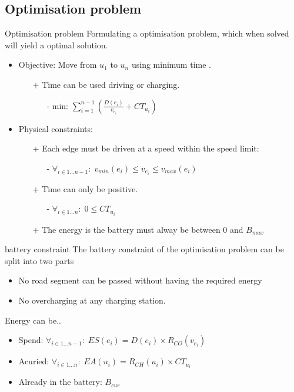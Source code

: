 \subsection{Optimisation problem}
\begin{frame}{Optimisation problem}
Formulating a optimisation problem, which when solved will yield a optimal solution. 
\begin{itemize}
\item Objective: Move from $u_1$ to $u_n$ using minimum time . 
\begin{itemize}
\item[+] Time can be used driving or charging. 
\begin{itemize}
\item[-] $\text{min: } \sum_{i=1}^{n-1} \left(\frac{D(e_i)}{v_{e_i}} + CT_{u_i} \right)$
\end{itemize}
\end{itemize}
\item Physical constraints:
\begin{itemize}
\item[+] Each edge must be driven at a speed within the speed limit:\begin{itemize}
\item [-] $\forall_{i\in1 \dots n-1 }:\;v_{min}(e_i) \leq v_{e_i} \leq v_{max}(e_i)$
\end{itemize}
\item[+] Time can only be positive.\begin{itemize}
\item [-] $\forall_{i\in1 \dots n }:\; 0 \leq CT_{u_i} $
\end{itemize}

\item[+] The energy is the battery must alway be between 0 and $B_{max}$
\end{itemize}
\end{itemize} 
\end{frame}
\begin{frame}{battery constraint}
The battery constraint of the optimisation problem can be split into two parts
\begin{itemize}
\item No road segment can be passed without having the required energy
\item No overcharging at any charging station. 
\end{itemize}
Energy can be..
\begin{itemize}
\item Spend: $\forall_{i\in1 \dots n-1 }:\; ES(e_i) = D(e_i) \times R_{CO}(v_{e_i})$
\item Acuried: $\forall_{i\in1 \dots n }:\; EA(u_i) = R_{CH}(u_i) \times CT_{u_i}$
\item Already in the battery: $B_{cur}$
\end{itemize}
\end{frame}
